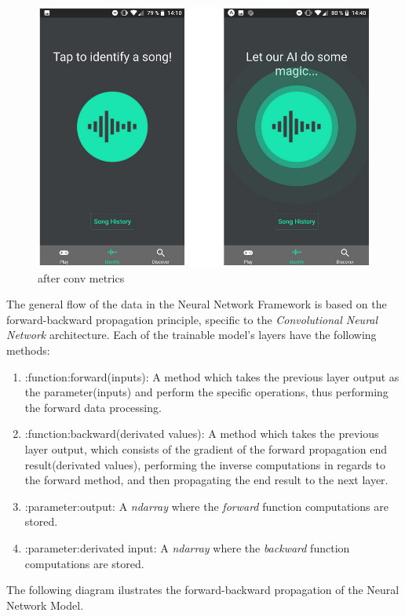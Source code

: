 \begin{figure}[H]
	\centering
	\includegraphics{images/spektrum.png}
	\caption{after conv metrics}
\label{good_metrics}
\end{figure}


The general flow of the data in the Neural Network Framework is based on the forward-backward propagation principle,
specific to the \textit{Convolutional Neural Network} architecture.
Each of the trainable model's layers have the following methods:

\begin{enumerate}
	\item :function:forward(inputs): A method which takes the previous layer output as the parameter(inputs)
	and perform the specific operations, thus performing the forward data processing.
	\item :function:backward(derivated values): A method which takes the previous layer output, which consists
	of the gradient of the forward propagation end result(derivated values), performing the inverse
	computations in regards to the forward method, and then propagating the end result to the next layer.
	\item :parameter:output: A \textit{ndarray} where the \textit{forward} function computations are stored.
	\item :parameter:derivated input: A \textit{ndarray} where the \textit{backward} function computations are stored.

\end{enumerate}

The following diagram ilustrates the forward-backward propagation of the Neural Network Model.

